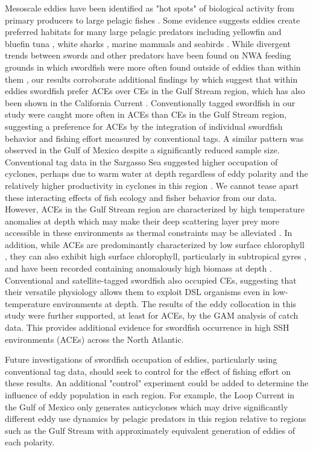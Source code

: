 Mesoscale eddies have been identified as "hot spots" of biological activity from primary producers \citep{McGillicuddy2007} to large pelagic fishes \citep{Hobday2014, Gaube2018}. Some evidence suggests eddies create preferred habitats for many large pelagic predators including yellowfin and bluefin tuna \citep{Teo2007, Hsu2015}, white sharks \citep{Gaube2018}, marine mammals \citep{Bailleul2010} and seabirds \citep{TewKai2009}. While divergent trends between swords and other predators have been found on NWA feeding grounds in which swordfish were more often found outside of eddies than within them \citep{Hsu2015}, our results corroborate additional findings by \citet{Hsu2015} which suggest that within eddies swordfish prefer ACEs over CEs in the Gulf Stream region, which has also been shown in the California Current \citep{Scales2017}. Conventionally tagged swordfish in our study were caught more often in ACEs than CEs in the Gulf Stream region, suggesting a preference for ACEs by the integration of individual swordfish behavior and fishing effort measured by conventional tags. A similar pattern was observed in the Gulf of Mexico despite a significantly reduced sample size. Conventional tag data in the Sargasso Sea suggested higher occupation of cyclones, perhaps due to warm water at depth regardless of eddy polarity and the relatively higher productivity in cyclones \citep{Gaube2014} in this region \citep[except see ][]{Dufois2016}. We cannot tease apart these interacting effects of fish ecology and fisher behavior from our data. However, ACEs in the Gulf Stream region are characterized by high temperature anomalies at depth which may make their deep scattering layer prey more accessible in these environments as thermal constraints may be alleviated \citep{Gaube2018}. In addition, while ACEs are predominantly characterized by low surface chlorophyll \citep{Gaube2014}, they can also exhibit high surface chlorophyll, particularly in subtropical gyres \citep{Dufois2016}, and have been recorded containing anomalously high biomass at depth \citep{Fennell2015}. Conventional and satellite-tagged swordfish also occupied CEs, suggesting that their versatile physiology allows them to exploit DSL organisms even in low-temperature environments at depth. The results of the eddy collocation in this study were further supported, at least for ACEs, by the GAM analysis of catch data. This provides additional evidence for swordfish occurrence in high SSH environments (ACEs) across the North Atlantic.

Future investigations of swordfish occupation of eddies, particularly using conventional tag data, should seek to control for the effect of fishing effort on these results. An additional "control" experiment could be added to determine the influence of eddy population in each region. For example, the Loop Current in the Gulf of Mexico only generates anticyclones which may drive significantly different eddy use dynamics by pelagic predators in this region relative to regions such as the Gulf Stream with approximately equivalent generation of eddies of each polarity.

